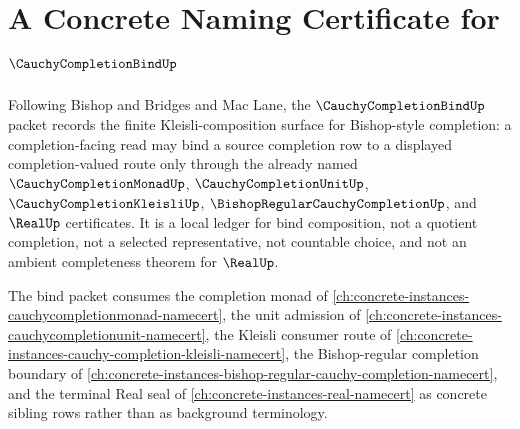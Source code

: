 \chapter{A Concrete Naming Certificate for $\CauchyCompletionBindUp$}
\label{ch:concrete-instances-cauchy-completion-bind-namecert}

Following Bishop and Bridges and Mac Lane, the $\CauchyCompletionBindUp$ packet records the finite Kleisli-composition surface for Bishop-style completion: a completion-facing read may bind a source completion row to a displayed completion-valued route only through the already named $\CauchyCompletionMonadUp$, $\CauchyCompletionUnitUp$, $\CauchyCompletionKleisliUp$, $\BishopRegularCauchyCompletionUp$, and $\RealUp$ certificates. It is a local ledger for bind composition, not a quotient completion, not a selected representative, not countable choice, and not an ambient completeness theorem for $\RealUp$.

The bind packet consumes the completion monad of \autoref{ch:concrete-instances-cauchycompletionmonad-namecert}, the unit admission of \autoref{ch:concrete-instances-cauchycompletionunit-namecert}, the Kleisli consumer route of \autoref{ch:concrete-instances-cauchy-completion-kleisli-namecert}, the Bishop-regular completion boundary of \autoref{ch:concrete-instances-bishop-regular-cauchy-completion-namecert}, and the terminal Real seal of \autoref{ch:concrete-instances-real-namecert} as concrete sibling rows rather than as background terminology.

